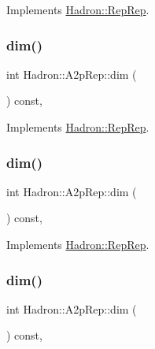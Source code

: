 Implements \mbox{\hyperlink{structHadron_1_1RepRep_a92c8802e5ed7afd7da43ccfd5b7cd92b}{Hadron\+::\+Rep\+Rep}}.

\mbox{\label{structHadron_1_1A2pRep_ad62519ad376b83f6d4c434d2f2a01825}} 
\subsubsection{\texorpdfstring{dim()}{dim()}\hspace{0.1cm}{\footnotesize\ttfamily [3/5]}}
{\footnotesize\ttfamily int Hadron\+::\+A2p\+Rep\+::dim (\begin{DoxyParamCaption}{ }\end{DoxyParamCaption}) const\hspace{0.3cm}{\ttfamily [inline]}, {\ttfamily [virtual]}}



Implements \mbox{\hyperlink{structHadron_1_1RepRep_a92c8802e5ed7afd7da43ccfd5b7cd92b}{Hadron\+::\+Rep\+Rep}}.

\mbox{\label{structHadron_1_1A2pRep_ad62519ad376b83f6d4c434d2f2a01825}} 
\subsubsection{\texorpdfstring{dim()}{dim()}\hspace{0.1cm}{\footnotesize\ttfamily [4/5]}}
{\footnotesize\ttfamily int Hadron\+::\+A2p\+Rep\+::dim (\begin{DoxyParamCaption}{ }\end{DoxyParamCaption}) const\hspace{0.3cm}{\ttfamily [inline]}, {\ttfamily [virtual]}}



Implements \mbox{\hyperlink{structHadron_1_1RepRep_a92c8802e5ed7afd7da43ccfd5b7cd92b}{Hadron\+::\+Rep\+Rep}}.

\mbox{\label{structHadron_1_1A2pRep_ad62519ad376b83f6d4c434d2f2a01825}} 
\subsubsection{\texorpdfstring{dim()}{dim()}\hspace{0.1cm}{\footnotesize\ttfamily [5/5]}}
{\footnotesize\ttfamily int Hadron\+::\+A2p\+Rep\+::dim (\begin{DoxyParamCaption}{ }\end{DoxyParamCaption}) const\hspace{0.3cm}{\ttfamily [inline]}, {\ttfamily [virtual]}}



